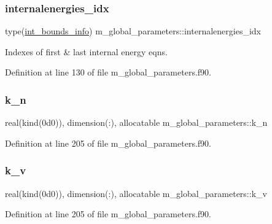 \subsubsection{\texorpdfstring{internalenergies\+\_\+idx}{internalenergies\_idx}}
{\footnotesize\ttfamily type(\hyperlink{structm__derived__types_1_1int__bounds__info}{int\+\_\+bounds\+\_\+info}) m\+\_\+global\+\_\+parameters\+::internalenergies\+\_\+idx}



Indexes of first \& last internal energy eqns. 



Definition at line 130 of file m\+\_\+global\+\_\+parameters.\+f90.

\mbox{\label{namespacem__global__parameters_a555eda1318a218d37d1bdd8f4d57eaf2}} 
\subsubsection{\texorpdfstring{k\+\_\+n}{k\_n}}
{\footnotesize\ttfamily real(kind(0d0)), dimension(\+:), allocatable m\+\_\+global\+\_\+parameters\+::k\+\_\+n}



Definition at line 205 of file m\+\_\+global\+\_\+parameters.\+f90.

\mbox{\label{namespacem__global__parameters_a1943ea5a5127e94a197afae57be95758}} 
\subsubsection{\texorpdfstring{k\+\_\+v}{k\_v}}
{\footnotesize\ttfamily real(kind(0d0)), dimension(\+:), allocatable m\+\_\+global\+\_\+parameters\+::k\+\_\+v}



Definition at line 205 of file m\+\_\+global\+\_\+parameters.\+f90.

\mbox{\label{namespacem__global__parameters_adfaf902b37292b91750274e26989e8e6}} 
